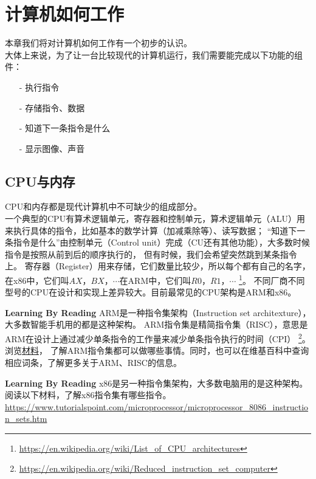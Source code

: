 \chapter{计算机如何工作}
本章我们将对计算机如何工作有一个初步的认识。\\
大体上来说，为了让一台比较现代的计算机运行，我们需要能完成以下功能的组件：\\
\begin{itemize}
\item[-]执行指令
\item[-]存储指令、数据
\item[-]知道下一条指令是什么
\item[-]显示图像、声音
\end{itemize}
\section{CPU与内存}
CPU和内存都是现代计算机中不可缺少的组成部分。\\
一个典型的CPU有算术逻辑单元，寄存器和控制单元，算术逻辑单元（ALU）用来执行具体的指令，比如基本的数学计算（加减乘除等）、读写数据；
“知道下一条指令是什么”由控制单元（Control unit）完成（CU还有其他功能），大多数时候指令是按照从前到后的顺序执行的，
但有时候，我们会希望突然跳到某条指令上。
寄存器（Register）用来存储，它们数量比较少，所以每个都有自己的名字，在x86中，它们叫$AX$，$BX$，$\cdots$在ARM中，它们叫$R0$，$R1$，$\cdots$
\footnote{\url{https://en.wikipedia.org/wiki/List_of_CPU_architectures}}。
不同厂商不同型号的CPU在设计和实现上差异较大。目前最常见的CPU架构是ARM和x86。
\begin{paperbox}{\textbf{Learning By Reading}\starone}
ARM是一种指令集架构（Instruction set architexture），大多数智能手机用的都是这种架构。
ARM指令集是精简指令集（RISC），意思是ARM在设计上通过减少单条指令的工作量来减少单条指令执行的时间（CPI）
\footnote{\url{https://en.wikipedia.org/wiki/Reduced_instruction_set_computer}}。
浏览\href{http://infocenter.arm.com/help/topic/com.arm.doc.qrc0006ec/QRC0006_UAL16.pdf}{材料}，
了解ARM指令集都可以做哪些事情。同时，也可以在维基百科中查询相应词条，了解更多关于ARM、RISC的信息。
\end{paperbox}
\begin{paperbox}{\textbf{Learning By Reading}\starone}
x86是另一种指令集架构，大多数电脑用的是这种架构。
阅读以下材料，了解x86指令集有哪些指令。\\
\url{https://www.tutorialspoint.com/microprocessor/microprocessor_8086_instruction_sets.htm}
\end{paperbox}
